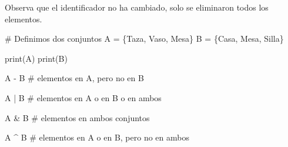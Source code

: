 \documentclass[
  letterpaper,
  DIV=11,
  numbers=noendperiod]{scrreprt}
\newenvironment{Shaded}{\begin{snugshade}}{\end{snugshade}}
\newcommand{\BuiltInTok}[1]{\textcolor[rgb]{0.00,0.23,0.31}{#1}}
\newcommand{\CommentTok}[1]{\textcolor[rgb]{0.37,0.37,0.37}{#1}}
\newcommand{\NormalTok}[1]{\textcolor[rgb]{0.00,0.23,0.31}{#1}}
\newcommand{\OperatorTok}[1]{\textcolor[rgb]{0.37,0.37,0.37}{#1}}
\newcommand{\StringTok}[1]{\textcolor[rgb]{0.13,0.47,0.30}{#1}}
\begin{document}
Observa que el identificador no ha cambiado, solo se eliminaron todos
los elementos.

\begin{Shaded}
\begin{Highlighting}[]
\CommentTok{\# Definimos dos conjuntos}
\NormalTok{A }\OperatorTok{=}\NormalTok{ \{}\StringTok{\textquotesingle{}Taza\textquotesingle{}}\NormalTok{, }\StringTok{\textquotesingle{}Vaso\textquotesingle{}}\NormalTok{, }\StringTok{\textquotesingle{}Mesa\textquotesingle{}}\NormalTok{\}}
\NormalTok{B }\OperatorTok{=}\NormalTok{ \{}\StringTok{\textquotesingle{}Casa\textquotesingle{}}\NormalTok{, }\StringTok{\textquotesingle{}Mesa\textquotesingle{}}\NormalTok{, }\StringTok{\textquotesingle{}Silla\textquotesingle{}}\NormalTok{\}}
\end{Highlighting}
\end{Shaded}

\begin{Shaded}
\begin{Highlighting}[]
\BuiltInTok{print}\NormalTok{(A)}
\BuiltInTok{print}\NormalTok{(B)}
\end{Highlighting}
\end{Shaded}

\begin{Shaded}
\begin{Highlighting}[]
\NormalTok{A }\OperatorTok{{-}}\NormalTok{ B }\CommentTok{\# elementos en A, pero no en B}
\end{Highlighting}
\end{Shaded}

\begin{Shaded}
\begin{Highlighting}[]
\NormalTok{A }\OperatorTok{|}\NormalTok{ B }\CommentTok{\# elementos en A o en B o en ambos}
\end{Highlighting}
\end{Shaded}

\begin{Shaded}
\begin{Highlighting}[]
\NormalTok{A }\OperatorTok{\&}\NormalTok{ B }\CommentTok{\# elementos en ambos conjuntos}
\end{Highlighting}
\end{Shaded}

\begin{Shaded}
\begin{Highlighting}[]
\NormalTok{A }\OperatorTok{\^{}}\NormalTok{ B }\CommentTok{\# elementos en A o en B, pero no en ambos}
\end{Highlighting}
\end{Shaded}
\end{document}
